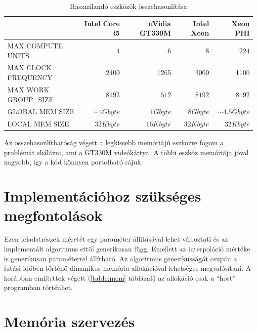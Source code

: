 	\begin{table}[!h]
	\setlength{\extrarowheight}{8pt}
	\caption{Használandó eszközök összehasonlítása}
	\label{table:envs}
	\centering
	\footnotesize
	\begin{tabular}{ l | r | r | r | r}
		 & Intel Core i5 & nVidia GT330M & Intel Xeon & Xeon PHI \\ \hline
		MAX COMPUTE UNITS & $4$ & $6$ & $8$ & $224$\\
		MAX CLOCK FREQUENCY & 2400 & 1265 & 3000 & 1100\\
		MAX WORK GROUP\_SIZE & $8192$ & $512$ & $8192$ & $8192$ \\ \hline\hline
		GLOBAL MEM SIZE & $\sim 4Gbyte$ & $1Gbyte$ & $8Gbyte$ & $\sim 4.5Gbyte$\\
		LOCAL MEM SIZE & $32 Kbyte$ & $16 Kbyte$ & $32 Kbyte$ & $32 Kbyte$\\
	\end{tabular}
	\end{table}
	
	Az összehasonlíthatóság végett a legkissebb memóriájú eszközre fogom a problémát skálázni, ami a
	GT330M videókártya. A többi eszköz memóriája jóval nagyobb, így a kód könnyen portolható rájuk.

\section{Implementációhoz szükséges megfontolások}

	Ezen feladatrészek méretét egy paraméter állításával lehet változtati és az
	implementált algoritmus ettől generikusan függ.
	Emellett az interpoláció mértéke is generikusan paraméterrel állítható.
	Az algoritmus generikusságát csupán a futási időben történő dinamikus memória
	allokációval lehetséges megvalósítani. A korábban említettek végett (\ref{table:mem} táblázat)
	az allokáció csak a ``host'' programban történhet.

\section{Memória szervezés}
